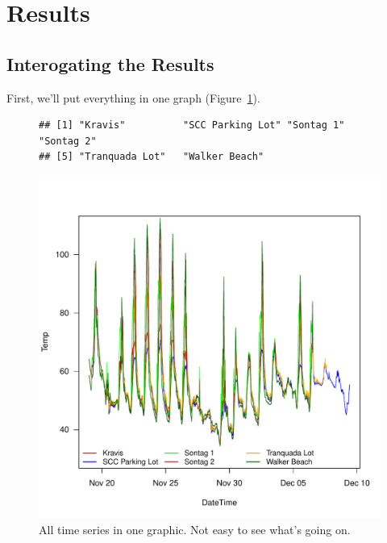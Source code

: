 \documentclass{article}\usepackage[]{graphicx}\usepackage[]{color}
\makeatletter
\def\maxwidth{ %
  \ifdim\Gin@nat@width>\linewidth
    \linewidth
  \else
    \Gin@nat@width
  \fi
}
\newenvironment{kframe}{%
 \def\at@end@of@kframe{}%
 \ifinner\ifhmode%
  \def\at@end@of@kframe{\end{minipage}}%
  \begin{minipage}{\columnwidth}%
 \fi\fi%
 \def\FrameCommand##1{\hskip\@totalleftmargin \hskip-\fboxsep
 \colorbox{shadecolor}{##1}\hskip-\fboxsep
     \hskip-\linewidth \hskip-\@totalleftmargin \hskip\columnwidth}%
 \MakeFramed {\advance\hsize-\width
   \@totalleftmargin\z@ \linewidth\hsize
   \@setminipage}}%
 {\par\unskip\endMakeFramed%
 \at@end@of@kframe}
\newenvironment{knitrout}{}{} %
\makeatother
\begin{document}
\section{Results}

\subsection{Interogating the Results}

First, we'll put everything in one graph (Figure~\ref{fig.alldatat}).

\begin{figure}
\caption{All time series in one graphic. Not easy to see what's going on.}
\label{fig.alldatat}

\begin{knitrout}
\color{fgcolor}\begin{kframe}
\begin{verbatim}
## [1] "Kravis"          "SCC Parking Lot" "Sontag 1"        "Sontag 2"       
## [5] "Tranquada Lot"   "Walker Beach"
\end{verbatim}
\end{kframe}
\includegraphics[width=\maxwidth]{figure/unnamed-chunk-5-1} 

\end{knitrout}
\end{figure}
\end{document}
